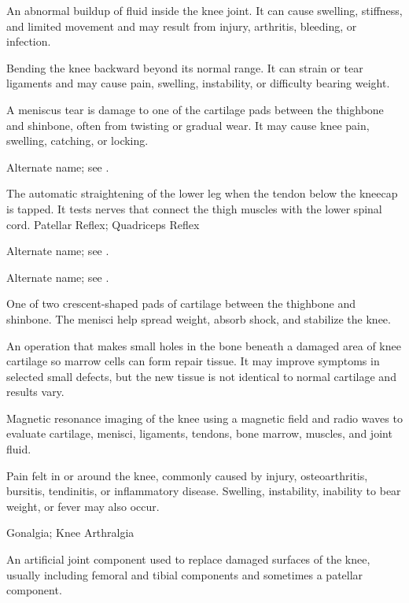  An abnormal buildup of fluid inside the knee joint. It can cause swelling, stiffness, and limited movement and may result from injury, arthritis, bleeding, or infection.

 Bending the knee backward beyond its normal range. It can strain or tear ligaments and may cause pain, swelling, instability, or difficulty bearing weight.

 A meniscus tear is damage to one of the cartilage pads between the thighbone and shinbone, often from twisting or gradual wear. It may cause knee pain, swelling, catching, or locking.

 Alternate name; see .

 The automatic straightening of the lower leg when the tendon below the kneecap is tapped. It tests nerves that connect the thigh muscles with the lower spinal cord.
\synonyms
Patellar Reflex; Quadriceps Reflex

 Alternate name; see .

 Alternate name; see .

 One of two crescent-shaped pads of cartilage between the thighbone and shinbone. The menisci help spread weight, absorb shock, and stabilize the knee.

 An operation that makes small holes in the bone beneath a damaged area of knee cartilage so marrow cells can form repair tissue. It may improve symptoms in selected small defects, but the new tissue is not identical to normal cartilage and results vary.

 Magnetic resonance imaging of the knee using a magnetic field and radio waves to evaluate cartilage, menisci, ligaments, tendons, bone marrow, muscles, and joint fluid.

 Pain felt in or around the knee, commonly caused by injury, osteoarthritis, bursitis, tendinitis, or inflammatory disease. Swelling, instability, inability to bear weight, or fever may also occur.

\synonyms
Gonalgia; Knee Arthralgia

 An artificial joint component used to replace damaged surfaces of the knee, usually including femoral and tibial components and sometimes a patellar component.

